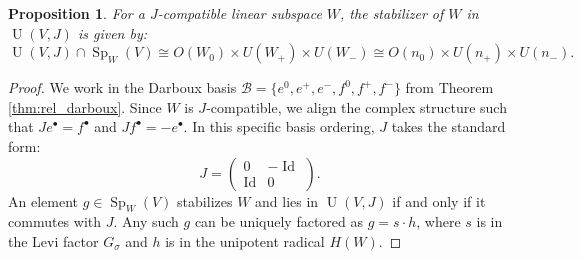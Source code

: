 \documentclass[12pt, final]{article}
\def\Sp{\operatorname{Sp}}
\def\U{\operatorname{U}}
\def\Id{\operatorname{Id}}
\newtheorem{proposition}[theorem]{Proposition}
\begin{document}
\begin{proposition}
For a $J$-compatible linear subspace $W$, the stabilizer of $W$ in $\U(V, J)$ is given by:
\[ \U(V, J) \cap \Sp_W(V) \cong O(W_0) \times U(W_+) \times U(W_-) \cong O(n_0) \times U(n_+) \times U(n_-). \]
\end{proposition}
\begin{proof}
We work in the Darboux basis $\mathcal{B} = \{e^0, e^+, e^-, f^0, f^+, f^-\}$ from Theorem \ref{thm:rel_darboux}. Since $W$ is $J$-compatible, we align the complex structure such that $Je^\bullet = f^\bullet$ and $Jf^\bullet = -e^\bullet$. In this specific basis ordering, $J$ takes the standard form:
\[
J = \begin{pmatrix} 0 & -\Id \\ \Id & 0 \end{pmatrix}.
\]
An element $g \in \Sp_W(V)$ stabilizes $W$ and lies in $\U(V, J)$ if and only if it commutes with $J$. Any such $g$ can be uniquely factored as $g = s \cdot h$, where $s$ is in the Levi factor $G_\sigma$ and $h$ is in the unipotent radical $H(W)$.


\end{proof}
\end{document}
